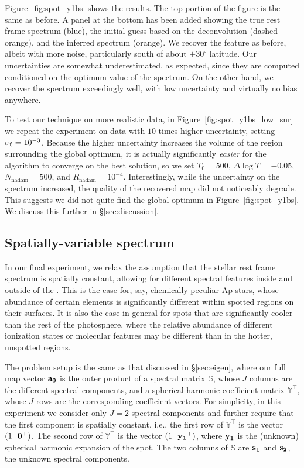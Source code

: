 \documentclass[modern]{aastex62}
\begin{document}
Figure~\ref{fig:spot_y1bs} shows the results. The top portion of the figure is
the same as before. A panel at the bottom has been added showing the true
rest frame spectrum (blue), the initial guess based on the deconvolution
(dashed orange), and the inferred spectrum (orange). We recover the \spot
feature as before, albeit with more noise, particularly south of about
$+30^\circ$ latitude. Our uncertainties are somewhat underestimated, as 
expected, since they are computed conditioned on the optimum value of 
the spectrum. On the other hand, we recover the spectrum exceedingly well,
with low uncertainty and virtually no bias anywhere.

To test our technique on more realistic data, in Figure~\ref{fig:spot_y1bs_low_snr}
we repeat the experiment on data with $10$ times higher uncertainty,
setting $\sigma_{\mathbf{f}} = 10^{-3}$. Because the higher uncertainty increases
the volume of the region surrounding the global optimum, it is
actually significantly \emph{easier} for the algorithm to converge on the
best solution, so we set $T_0 = 500$, $\Delta\log T = -0.05$, 
$N_\mathrm{nadam} = 500$, and $R_\mathrm{nadam} = 10^{-4}$. Interestingly,
while the uncertainty on the spectrum increased, the quality of the
recovered \spot map did not noticeably degrade. This suggests we did not
quite find the global optimum in Figure~\ref{fig:spot_y1bs}. We discuss
this further in \S\ref{sec:discussion}.

\subsection{Spatially-variable spectrum}
\label{sec:twospec}
%
In our final experiment, we relax the assumption that the stellar
rest frame spectrum is spatially constant, allowing for different
spectral features inside and outside of the \spot. This is the case
for, say, chemically peculiar Ap stars, whose abundance of certain
elements is significantly different within spotted regions on their
surfaces. It is also the case in general for spots that are significantly
cooler than the rest of the photosphere, where the relative abundance
of different ionization states or molecular features may be different
than in the hotter, unspotted regions.

The problem setup is the same as that discussed in \S\ref{sec:eigen}, where
our full map vector ${\mathbf{a_0}}$ is the outer product of a spectral matrix
$\mathbb{S}$, whose $J$ columns are the different spectral components, and
a spherical harmonic coefficient matrix $\mathbb{Y}^\top$, whose $J$ rows
are the corresponding coefficient vectors. For simplicity, in this experiment
we consider only $J = 2$ spectral components and further require that the
first component is spatially constant, i.e., the first row of 
$\mathbb{Y}^\top$ is the vector $(1 \quadquad \bvec{0}^\top)$. The second
row of $\mathbb{Y}^\top$ is the vector $(1 \quadquad \bvec{y_1}^\top)$, where
${\mathbf{y_1}}$ is the (unknown) spherical harmonic expansion of the spot. The
two columns of $\mathbb{S}$ are ${\mathbf{s_1}}$ and ${\mathbf{s_2}}$, the unknown
spectral components.
\end{document}
